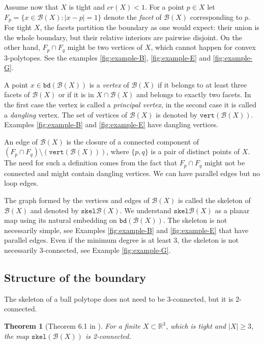 \documentclass{article}
\newtheorem{theorem}{Theorem}[section]
\newcounter{example}
\newcommand{\R}[0]{\mathbb{R}}
\newcommand{\Bc}[0]{\mathcal{B}}
\newcommand{\skel}[0]{\mathtt{skel}}
\newcommand{\bd}[0]{\mathtt{bd}}
\newcommand{\vertices}[0]{\mathtt{vert}}
\begin{document}
Assume now that \(X\) is tight and \(cr(X)<1\).  For a point $p \in X$ let $F_p = \{x \in
\Bc(X) : |x - p| = 1\}$ denote the \emph{facet} of $\Bc(X)$ corresponding to $p$. For tight $X$, the facets partition the boundary as one would expect: their union is the whole boundary, but their relative interiors are pairwise disjoint. On the other hand, $F_p\cap F_q$ might be two vertices of $X$, which cannot happen for convex 3-polytopes. See the examples \ref{fig:example-B}, \ref{fig:example-E} and \ref{fig:example-G}.

 A point $x\in \bd(\Bc(X))$ is a \emph{vertex} of $\Bc(X)$ if it belongs to at least three facets of $\Bc(X)$ or if it is in $X\cap \Bc(X)$ and belongs to exactly two facets. In the first case the vertex is called a \emph{principal vertex}, in the second case it is called a \emph{dangling} vertex. The set of vertices of $\Bc(X)$ is denoted by $\vertices(\Bc(X))$. Examples \ref{fig:example-B} and \ref{fig:example-E} have dangling vertices. 

  An edge of $\Bc(X)$ is the closure of a connected component of $(F_p\cap F_q) \setminus (\vertices(\Bc(X)))$, where $\{p, q\}$ is a pair of distinct points of $X$. The need for such a definition comes from the fact that $F_p\cap F_q$ might not be connected and might contain dangling vertices. We can have parallel edges but no loop edges.

 The graph formed by the vertices and edges of $\Bc(X)$ is called the skeleton of $\Bc(X)$ and denoted by $\skel \Bc(X)$. We understand $\skel \Bc(X)$ as a planar map using its natural embedding on $\bd (\Bc(X))$. The skeleton is not necessarily simple, see Examples \ref{fig:example-B} and \ref{fig:example-E} that have parallel edges. Even if the minimum degree is at least 3, the skeleton is not necessarily 3-connected, see Example \ref{fig:example-G}. 



\subsection{Structure of the boundary}
The skeleton of a ball polytope does not need to be 3-connected, but it is 2-connected.

\begin{theorem}[Theorem 6.1 in \cite{kupitz2010ball}]\label{thm:2connect}
For a finite $X\subset \R^3$, which is tight and $|X|\ge3$, the map \(\skel(\Bc(X))\) is 2-connected.
\end{theorem}
\end{document}
